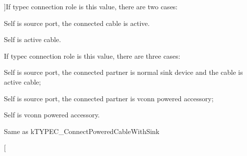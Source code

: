\begin{Desc}
\begin{description}
{}]If typec connection role is this value, there are two cases\-:
\begin{DoxyItemize}
\item Self is source port, the connected cable is active.
\item Self is active cable. 
\end{DoxyItemize}\item[{\em 
\hypertarget{group__usb__pd__stack_gga5dcf4d70a373001cfde169f0e8b9a1baa778111413f201ebe3e54208b7ada83da}{k\-T\-Y\-P\-E\-C\-\_\-\-Connect\-Powered\-Cable\-With\-Sink}\label{group__usb__pd__stack_gga5dcf4d70a373001cfde169f0e8b9a1baa778111413f201ebe3e54208b7ada83da}
}]If typec connection role is this value, there are three cases\-:
\begin{DoxyItemize}
\item Self is source port, the connected partner is normal sink device and the cable is active cable;
\item Self is source port, the connected partner is vconn powered accessory;
\item Self is vconn powered accessory. 
\end{DoxyItemize}\item[{\em 
\hypertarget{group__usb__pd__stack_gga5dcf4d70a373001cfde169f0e8b9a1baabe52f1d315591ba1128796fe989888b6}{k\-T\-Y\-P\-E\-C\-\_\-\-Connect\-Vconn\-Powered\-Accessory}\label{group__usb__pd__stack_gga5dcf4d70a373001cfde169f0e8b9a1baabe52f1d315591ba1128796fe989888b6}
}]Same as k\-T\-Y\-P\-E\-C\-\_\-\-Connect\-Powered\-Cable\-With\-Sink \item[{\em 
}
\end{description}
\end{Desc}
